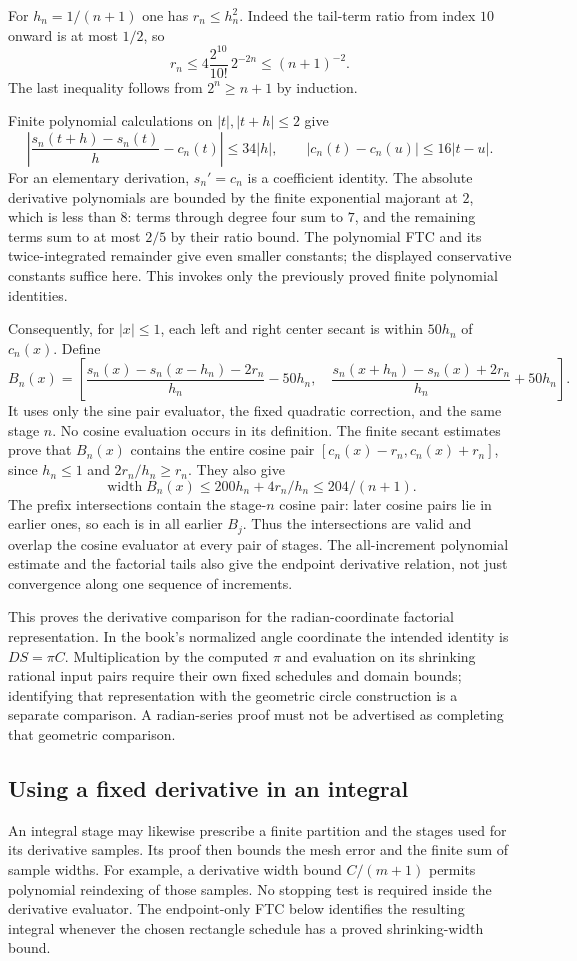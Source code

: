 For $h_n=1/(n+1)$ one has $r_n\le h_n^2$.  Indeed the tail-term ratio
from index $10$ onward is at most $1/2$, so
\[
 r_n\le4\frac{2^{10}}{10!}\,2^{-2n}\le(n+1)^{-2}.
\]
The last inequality follows from $2^n\ge n+1$ by induction.

Finite polynomial calculations on $|t|,|t+h|\le2$ give
\[
 \left|\frac{s_n(t+h)-s_n(t)}h-c_n(t)\right|\le34|h|,
 \qquad |c_n(t)-c_n(u)|\le16|t-u|.
\]
For an elementary derivation, $s_n'=c_n$ is a coefficient identity.
The absolute derivative polynomials are bounded by the finite exponential
majorant at $2$, which is less than $8$: terms through degree four sum
to $7$, and the remaining terms sum to at most $2/5$ by their ratio
bound.  The polynomial FTC and its twice-integrated remainder give even
smaller constants; the displayed conservative constants suffice here.
This invokes only the previously proved finite polynomial identities.

Consequently, for $|x|\le1$, each left and right center secant is within
$50h_n$ of $c_n(x)$.  Define
\[
 B_n(x)=\left[
 \frac{s_n(x)-s_n(x-h_n)-2r_n}{h_n}-50h_n,
 \quad
 \frac{s_n(x+h_n)-s_n(x)+2r_n}{h_n}+50h_n
 \right].
\]
It uses only the sine pair evaluator, the fixed quadratic correction,
and the same stage $n$.  No cosine evaluation occurs in its definition.
The finite secant estimates prove that $B_n(x)$ contains the entire
cosine pair $[c_n(x)-r_n,c_n(x)+r_n]$, since $h_n\le1$ and
$2r_n/h_n\ge r_n$.  They also give
\[
 \operatorname{width}B_n(x)\le200h_n+4r_n/h_n\le204/(n+1).
\]
The prefix intersections contain the stage-$n$ cosine pair: later cosine
pairs lie in earlier ones, so each is in all earlier $B_j$.  Thus the
intersections are valid and overlap the cosine evaluator at every pair
of stages.  The all-increment polynomial estimate and the factorial tails
also give the endpoint derivative relation, not just convergence along
one sequence of increments.

This proves the derivative comparison for the radian-coordinate factorial
representation.  In the book's normalized angle coordinate the intended
identity is $D S=\pi C$.  Multiplication by the computed $\pi$ and
evaluation on its shrinking rational input pairs require their own fixed
schedules and domain bounds; identifying that representation with the
geometric circle construction is a separate comparison.  A radian-series
proof must not be advertised as completing that geometric comparison.

\subsection{Using a fixed derivative in an integral}
An integral stage may likewise prescribe a finite partition and the
stages used for its derivative samples.  Its proof then bounds the mesh
error and the finite sum of sample widths.  For example, a derivative
width bound $C/(m+1)$ permits polynomial reindexing of those samples.
No stopping test is required inside the derivative evaluator.  The
endpoint-only FTC below identifies the resulting integral whenever the
chosen rectangle schedule has a proved shrinking-width bound.
